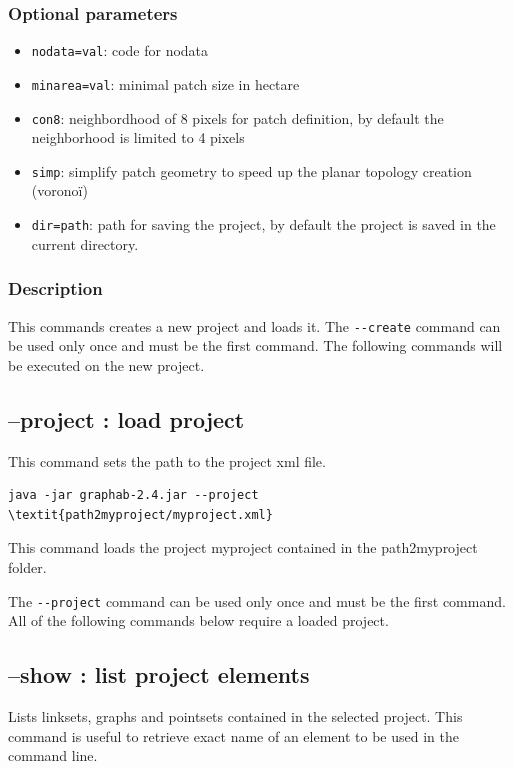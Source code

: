 \documentclass[a4paper,10pt]{report}
\begin{document}
\subsubsection{Optional parameters}
\begin{itemize}
	\item \verb|nodata=val|: code for nodata
	\item \verb|minarea=val|: minimal patch size in hectare
	\item \verb|con8|: neighbordhood of 8 pixels for patch definition, by default the neighborhood is limited to 4 pixels
	\item \verb|simp|: simplify patch geometry to speed up the planar topology creation (voronoï)
	\item \verb|dir=path|: path for saving the project, by default the project is saved in the current directory.
\end{itemize}

\subsubsection{Description}
This commands creates a new project and loads it.
The \verb|--create| command can be used only once and must be the first command.
The following commands will be executed on the new project.

\subsection{--project : load project}
This command sets the path to the project xml file.
\begin{Verbatim}[commandchars=\\\{\}]
java -jar graphab-2.4.jar --project \textit{path2myproject/myproject.xml}
\end{Verbatim}
This command loads the project myproject contained in the path2myproject folder.

The \verb|--project| command can be used only once and must be the first command.
All of the following commands below require a loaded project. 

\subsection{--show : list project elements}
Lists linksets, graphs and pointsets contained in the selected project. This command is useful to retrieve exact name of an element to be used in the command line.
\end{document}
